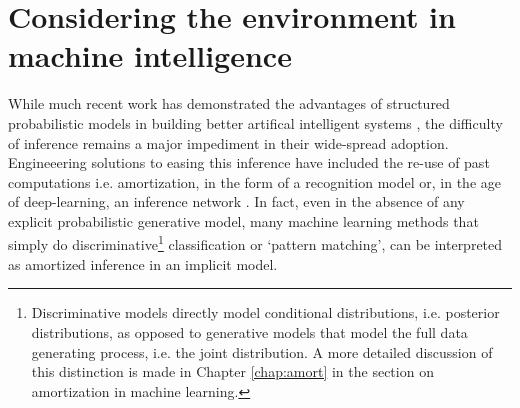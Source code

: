 
\section*{Considering the environment in machine intelligence}

While much recent work has demonstrated the advantages of structured probabilistic models in building better artifical intelligent systems \citep{lake2015human, del2013understanding, zhao2011image, steyvers2007probabilistic}, the difficulty of inference remains a major impediment in their wide-spread adoption. Engineeering solutions to easing this inference have included the re-use of past computations i.e. amortization, in the form of a recognition model\citep{dayan1995helmholtz, kingma2014auto} or, in the age of deep-learning, an inference network \citep{kulkarni2015picture, mnih2014neural, rezende2015variational, paige2016inference}. In fact, even in the absence of any explicit probabilistic generative model, many machine learning methods that simply do discriminative\footnote{Discriminative models directly model conditional distributions, i.e. posterior distributions, as opposed to generative models that model the full data generating process, i.e. the joint distribution. A more detailed discussion of this distinction is made in Chapter \ref{chap:amort} in the section on amortization in machine learning.} classification or `pattern matching', can be interpreted as amortized inference in an implicit model.%

